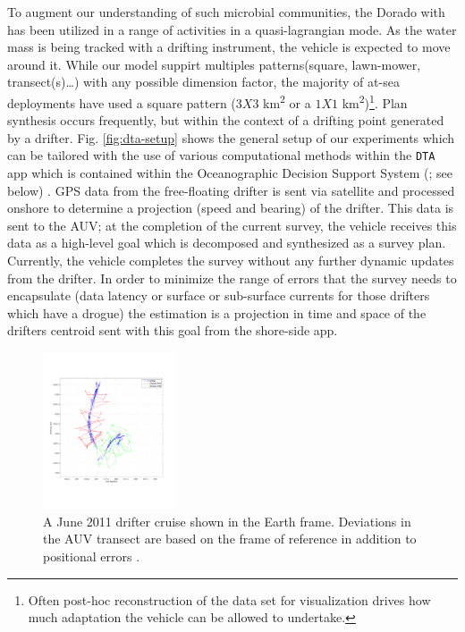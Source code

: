 To augment our understanding of such microbial communities, the Dorado
with \rx has been utilized in a range of activities in a
quasi-lagrangian mode. As the water mass is being tracked with a
drifting instrument, the vehicle is expected to move around it. While
our model suppirt multiples patterns(square, lawn-mower,
transect(s)\dots) with any possible dimension factor, the
majority of at-sea deployments have used a square pattern ($3X3$
km\textsuperscript{2} or a $1X1$ km\textsuperscript{2})\footnote{Often
  post-hoc reconstruction of the data set for visualization drives how
  much adaptation the vehicle can be allowed to undertake.}. Plan
synthesis occurs frequently, but within the context of a drifting
point generated by a drifter. Fig. \ref{fig:dta-setup} shows the
general setup of our experiments which can be tailored with the use of
various computational methods within the \texttt{DTA} app which is
contained within the Oceanographic Decision Support System (\od; see
below) \cite{das11}. GPS data from the free-floating drifter is sent
via satellite and processed onshore to determine a projection (speed
and bearing) of the drifter. This data is sent to the AUV; at the
completion of the current survey, the vehicle receives this data as a
high-level goal which is decomposed and synthesized as a survey
plan. Currently, the vehicle completes the survey without any further
dynamic updates from the drifter. In order to minimize the range of
errors that the survey needs to encapsulate (data latency or surface
or sub-surface currents for those drifters which have a drogue) the
estimation is a projection in time and space of the drifters centroid
sent with this goal from the shore-side app.

\begin{figure}[htpb]
\centering
\includegraphics[width=0.35\textwidth]{figs/june11-drifter-follow-180-181.pdf}
\caption{\small{A June 2011 drifter cruise shown in the Earth
    frame. Deviations in the AUV transect are based on the frame of
    reference in addition to positional errors \cite{das11b}.}}
\label{fig:drifter-errors}
\end{figure}

